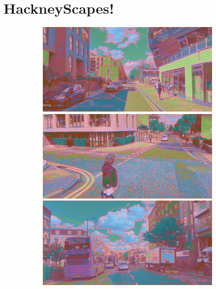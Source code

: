 \section{HackneyScapes!}
\label{hackneyscapes}

\begin{figure}[H]
	\begin{subfigure}[t]{.32\textwidth}
		\includegraphics[width=\textwidth]{city_images/HackneyScapes/Hackney3159_baseline.png} \\[5pt]
		\includegraphics[width=\textwidth]{city_images/HackneyScapes/Hackney3171_baseline.png} \\[5pt]
		\includegraphics[width=\textwidth]{city_images/HackneyScapes/Hackney3200_baseline.png} \\[5pt]

\end{subfigure}
\end{figure}
